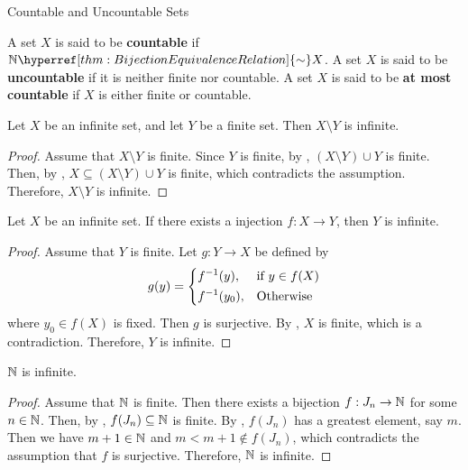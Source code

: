 \begin{section}{Countable and Uncountable Sets} \label{sec:CountableUncountableSets}

A set $X$ is said to be \textbf{countable} if $\N \hyperref[thm:BijectionEquivalenceRelation]{\sim} X$.
A set $X$ is said to be \textbf{uncountable} if it is neither finite nor countable.
A set $X$ is said to be \textbf{at most countable} if $X$ is either finite or countable.

\bigskip

\begin{theorem} \label{thm:InfiniteSetMinusFiniteSetIsInfinite}
    Let $X$ be an infinite set, and let $Y$ be a finite set. Then $X \setminus Y$ is infinite.
\end{theorem}

\begin{proof}
    Assume that $X \setminus Y$ is finite. Since $Y$ is finite, by ,
    $(X \setminus Y) \cup Y$ is finite. Then, by ,
    $X \subseteq (X \setminus Y) \cup Y$ is finite, which contradicts the assumption.
    Therefore, $X \setminus Y$ is infinite.
\end{proof}

\bigskip

\begin{theorem} \label{thm:InjectionFromInfiniteSetImpliesInfinite}
    Let $X$ be an infinite set. If there exists a injection $f: X \to Y$, then $Y$ is infinite.
\end{theorem}

\begin{proof}
    Assume that $Y$ is finite. Let $g: Y \to X$ be defined by
    \[
    g(y) = \begin{dcases}
        f^{-1}(y), & \text{if } y \in f(X) \\
        f^{-1}(y_{0}), & \text{Otherwise}
    \end{dcases}
    \]
    where $y_{0} \in f(X)$ is fixed. Then $g$ is surjective. By ,
    $X$ is finite, which is a contradiction. Therefore, $Y$ is infinite.
\end{proof}

\bigskip

\begin{lemma} \label{lem:NIsInfinite}
    $\mathbb{N}$ is infinite.
\end{lemma}

\begin{proof}
    Assume that $\mathbb{N}$ is finite. Then there exists a bijection $f: J_{n} \to \mathbb{N}$ for some $n \in \mathbb{N}$.
    Then, by , $f(J_{n}) \subseteq \mathbb{N}$ is finite. By
    , $f(J_{n})$ has a greatest element, say $m$.
    \\[6mm]
    Then we have $m + 1 \in \mathbb{N}$ and $m < m + 1 \notin f(J_{n})$,
    which contradicts the assumption that $f$ is surjective. Therefore, $\mathbb{N}$ is infinite.
\end{proof}


\end{section}
